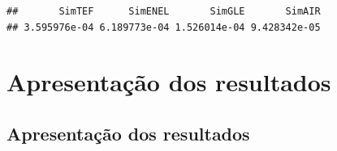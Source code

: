\documentclass[
  12pt,
  a4paper,
  openany]{book}
\newenvironment{Shaded}{\begin{snugshade}}{\end{snugshade}}
\newcommand{\DecValTok}[1]{\textcolor[rgb]{0.00,0.00,0.81}{#1}}
\newcommand{\NormalTok}[1]{#1}
\newcommand{\OperatorTok}[1]{\textcolor[rgb]{0.81,0.36,0.00}{\textbf{#1}}}
\newcommand{\StringTok}[1]{\textcolor[rgb]{0.31,0.60,0.02}{#1}}
\begin{document}
\begin{verbatim}
##       SimTEF      SimENEL       SimGLE       SimAIR 
## 3.595976e-04 6.189773e-04 1.526014e-04 9.428342e-05
\end{verbatim}

\begin{Shaded}
\end{Shaded}

\normalsize

\hypertarget{apresentauxe7uxe3o-dos-resultados}{%
\chapter{Apresentação dos resultados}\label{apresentauxe7uxe3o-dos-resultados}}

\endgroup
\newpage

\hypertarget{apresentauxe7uxe3o-dos-resultados-1}{%
\section{Apresentação dos resultados}\label{apresentauxe7uxe3o-dos-resultados-1}}
\end{document}
